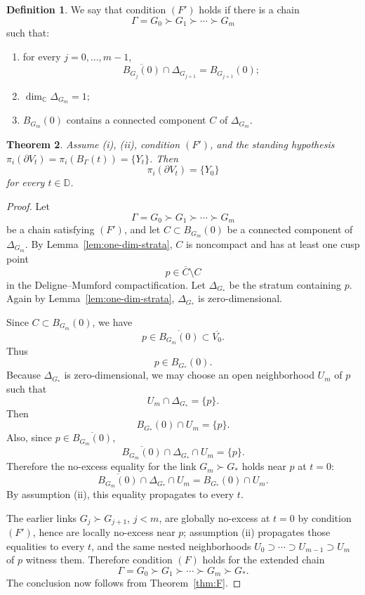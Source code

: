 \documentclass[12pt]{article}
\theoremstyle{plain}
\newtheorem{theorem}{Theorem}[section]
\theoremstyle{definition}
\newtheorem{definition}[theorem]{Definition}
\theoremstyle{remark}
\newcommand{\D}{\mathbb D}
\newcommand{\C}{\mathbb C}
\begin{document}
\begin{definition}\label{def:Fprime}
We say that condition \((F')\) holds if there is a chain
\[
\Gamma=G_0\succ G_1\succ \cdots \succ G_m
\]
such that:

\begin{enumerate}[label=(\alph*)]
  \item for every \(j=0,\dots,m-1\),
  \[
  \overline{B_{G_j}(0)}\cap \Delta_{G_{j+1}}
  =
  B_{G_{j+1}}(0);
  \]
  \item \(\dim_\C \Delta_{G_m}=1\);
  \item \(B_{G_m}(0)\) contains a connected component \(C\) of \(\Delta_{G_m}\).
\end{enumerate}
\end{definition}

\begin{theorem}\label{thm:Fprime}
Assume (i), (ii), condition \((F')\), and the standing hypothesis \(\pi_i(\partial V_t)=\pi_i(B_\Gamma(t))=\{Y_t\}\).  Then
\[
\pi_i(\partial V_t)=\{Y_0\}
\]
for every \(t\in\D\).
\end{theorem}

\begin{proof}
Let
\[
\Gamma=G_0\succ G_1\succ \cdots \succ G_m
\]
be a chain satisfying \((F')\), and let \(C\subset B_{G_m}(0)\) be a connected component of \(\Delta_{G_m}\).  By Lemma~\ref{lem:one-dim-strata}, \(C\) is noncompact and has at least one cusp point
\[
p\in \overline C\setminus C
\]
in the Deligne--Mumford compactification.  Let \(\Delta_{G_*}\) be the stratum containing \(p\).  Again by Lemma~\ref{lem:one-dim-strata}, \(\Delta_{G_*}\) is zero-dimensional.

Since \(C\subset B_{G_m}(0)\), we have
\[
p\in \overline{B_{G_m}(0)}\subset \overline{V_0}.
\]
Thus
\[
p\in B_{G_*}(0).
\]
Because \(\Delta_{G_*}\) is zero-dimensional, we may choose an open neighborhood \(U_m\) of \(p\) such that
\[
U_m\cap \Delta_{G_*}=\{p\}.
\]
Then
\[
B_{G_*}(0)\cap U_m=\{p\}.
\]
Also, since \(p\in \overline{B_{G_m}(0)}\),
\[
\overline{B_{G_m}(0)}\cap \Delta_{G_*}\cap U_m=\{p\}.
\]
Therefore the no-excess equality for the link \(G_m\succ G_*\) holds near \(p\) at \(t=0\):
\[
\overline{B_{G_m}(0)}\cap \Delta_{G_*}\cap U_m
=
B_{G_*}(0)\cap U_m.
\]
By assumption (ii), this equality propagates to every \(t\).

The earlier links \(G_j\succ G_{j+1}\), \(j<m\), are globally no-excess at \(t=0\) by condition \((F')\), hence are locally no-excess near \(p\); assumption (ii) propagates those equalities to every \(t\), and the same nested neighborhoods \(U_0\supset\cdots \supset U_{m-1}\supset U_m\) of \(p\) witness them.  Therefore condition \((F)\) holds for the extended chain
\[
\Gamma=G_0\succ G_1\succ \cdots \succ G_m\succ G_*.
\]
The conclusion now follows from Theorem~\ref{thm:F}.
\end{proof}
\end{document}
